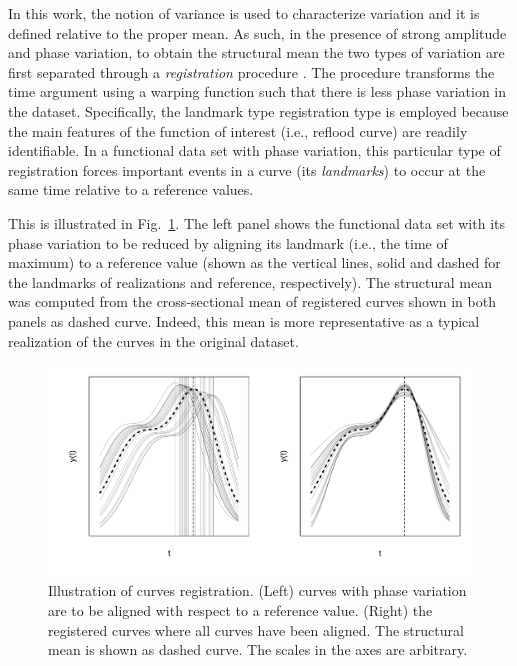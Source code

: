 In this work, the notion of variance is used to characterize variation and it is defined relative to the proper mean.
As such, in the presence of strong amplitude and phase variation, to obtain the structural mean the two types of variation are first separated through a \emph{registration} procedure \cite{Wang1997,Ramsay1998}.
The procedure transforms the time argument using a warping function such that there is less phase variation in the dataset.
Specifically, the landmark type registration type is employed because the main features of the function of interest (i.e., reflood curve) are readily identifiable.
In a functional data set with phase variation, this particular type of registration forces important events in a curve (its \emph{landmarks}) to occur at the same time relative to a reference values.

This is illustrated in Fig.~\ref{fig:illustrate_registered_curves}.
The left panel shows the functional data set with its phase variation to be reduced by aligning its landmark (i.e., the time of maximum) to a reference value 
(shown as the vertical lines, solid and dashed for the landmarks of realizations and reference, respectively).
The structural mean was computed from the cross-sectional mean of registered curves shown in both panels as dashed curve. 
Indeed, this mean is more representative as a typical realization of the curves in the original dataset.
\begin{figure}[bth!]
	\centering
	\includegraphics[scale=0.48,trim={0 1cm 0 0},clip]{../figures/r-figures/illustrateRegisteredCurves.png}
	\caption[Illustration of curves registration]{Illustration of curves registration. (Left) curves with phase variation are to be aligned with respect to a reference value. (Right) the registered curves where all curves have been aligned. The structural mean is shown as dashed curve. The scales in the axes are arbitrary.}
	\label{fig:illustrate_registered_curves}
\end{figure}

